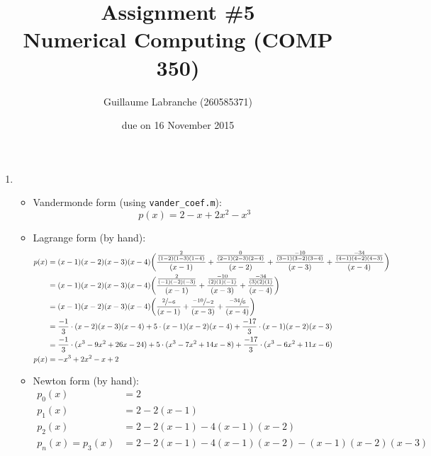 \documentclass{article}
\author{Guillaume Labranche (260585371)}
\title{Assignment \#5\\Numerical Computing (COMP 350)}
\date{due on 16 November 2015}
\begin{document}
\maketitle

\begin{enumerate}
\item 
\begin{itemize}
\item Vandermonde form (using \texttt{vander\_coef.m}): \begin{equation*}
p(x) = 2 - x + 2x^2 - x^3
\end{equation*}

\item Lagrange form (by hand):\begin{align*}
p(x) &= (x-1)(x-2)(x-3)(x-4)\bigg(
\frac{\frac{2}{(1-2)(1-3)(1-4)}}{(x-1)} +
\frac{\frac{0}{(2-1)(2-3)(2-4)}}{(x-2)} +
\frac{\frac{-10}{(3-1)(3-2)(3-4)}}{(x-3)} +
\frac{\frac{-34}{(4-1)(4-2)(4-3)}}{(x-4)}
\bigg)
\\ &= (x-1)(x-2)(x-3)(x-4)\bigg(
\frac{\frac{2}{(-1)(-2)(-3)}}{(x-1)} +
\frac{\frac{-10}{(2)(1)(-1)}}{(x-3)} +
\frac{\frac{-34}{(3)(2)(1)}}{(x-4)}
\bigg)
\\ &= (x-1)(x-2)(x-3)(x-4)\bigg(
\frac{\sfrac{2}{{-6}}}{(x-1)} +
\frac{\sfrac{{-10}}{{-2}}}{(x-3)} +
\frac{\sfrac{{-34}}{6}}{(x-4)}
\bigg)
\\ &=
\frac{-1}{{3}}\cdot (x-2)(x-3)(x-4) +
5 \cdot (x-1)(x-2)(x-4) +
\frac{{-17}}{3}\cdot (x-1)(x-2)(x-3)
\\ &=
\frac{-1}{{3}}\cdot (x^3-9 x^2+26 x-24) +
5 \cdot (x^3-7 x^2+14 x-8) +
\frac{{-17}}{3}\cdot (x^3-6 x^2+11 x-6)
\\ p(x) &= -x^3+2 x^2-x+2
\end{align*}

\item Newton form (by hand):\begin{align*}
p_0(x) &= 2 \\
p_1(x) &= 2 -2(x-1) \\
p_2(x) &= 2 -2(x-1) - 4(x-1)(x-2) \\
p_n(x) = p_3(x) &= 2 -2(x-1) - 4(x-1)(x-2) - (x-1)(x-2)(x-3) \\
\end{align*}

\end{itemize}
\end{enumerate}
\end{document}
